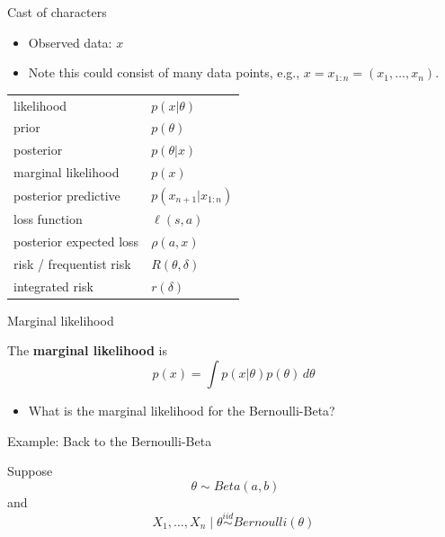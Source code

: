 \documentclass[
  ignorenonframetext,
]{beamer}
\providecommand{\tightlist}{%
  \setlength{\itemsep}{0pt}\setlength{\parskip}{0pt}}
\begin{document}
\begin{frame}{Cast of characters}
\protect\hypertarget{cast-of-characters}{}

\begin{itemize}
\tightlist
\item
  Observed data: \(x\)
\item
  Note this could consist of many data points, e.g.,
  \(x = x_{1:n}=(x_1,\dotsc,x_n)\).
\end{itemize}

\begin{center}
\begin{tabular}{ l l }
likelihood & $p(x|\theta)$  \\
prior & $p(\theta)$ \\
posterior & $p(\theta|x)$ \\
marginal likelihood & $p(x)$ \\
posterior predictive & $p(x_{n+1}|x_{1:n})$ \\
loss function & $\ell(s,a)$ \\
posterior expected loss & $\rho(a,x)$ \\
risk / frequentist risk & $R(\theta,\delta)$ \\
integrated risk & $r(\delta)$
\end{tabular}
\end{center}

\end{frame}

\begin{frame}{Marginal likelihood}
\protect\hypertarget{marginal-likelihood}{}

The \textbf{marginal likelihood} is
\[ p(x) = \int p(x|\theta) p(\theta) \,d\theta \]

\begin{itemize}
\tightlist
\item
  What is the marginal likelihood for the Bernoulli-Beta?
\end{itemize}

\end{frame}

\begin{frame}{Example: Back to the Bernoulli-Beta}
\protect\hypertarget{example-back-to-the-bernoulli-beta}{}

Suppose \[\; \theta\sim Beta(a,b)\] and
\[X_1,\dotsc,X_n\mid \theta \stackrel{iid}{\sim} Bernoulli(\theta)\]

\end{frame}
\end{document}
